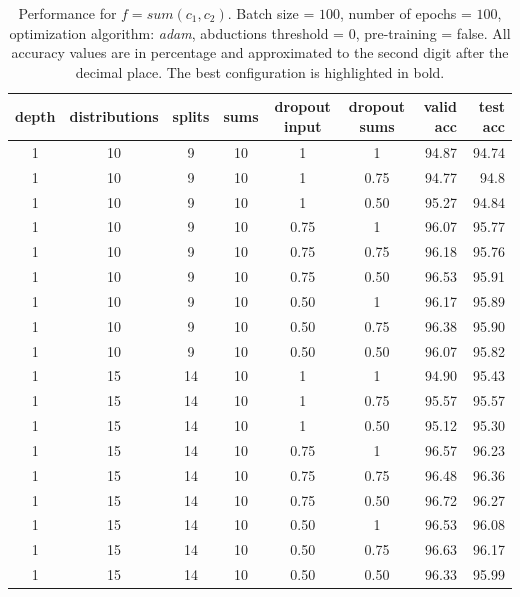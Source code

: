 \begin{table}[H]
  \centering
  \caption{Performance for $\mathit{f} = sum(\mathit{c}_1,\mathit{c}_2)$. Batch size = $100$, number of epochs = $100$, optimization algorithm: \textit{adam}, abductions threshold = 0, pre-training = false. All accuracy values are in percentage and approximated to the second digit after the decimal place. The best configuration is highlighted in bold.}
  \label{tab:results-pairs}
  \tiny
  \begin{tabular}{ccccccrr}
    \toprule
    depth		& distributions 	& splits 		& sums 				& dropout input 		& dropout sums 			& valid acc 			& test acc\\
    \midrule
    1      		& 10     			& 9      		& 10     			& 1      				& 1      				& 94.87    				& 94.74\\ 
    1      		& 10     			& 9      		& 10     			& 1      				& 0.75    				& 94.77    				& 94.8\\ 
    1      		& 10     			& 9      		& 10     			& 1      				& 0.50    				& 95.27    				& 94.84\\	
	1      		& 10     			& 9      		& 10     			& 0.75    				& 1      				& 96.07    				& 95.77\\
	1      		& 10     			& 9      		& 10     			& 0.75    				& 0.75    			    & 96.18    				& 95.76\\         
    1      		& 10     			& 9      		& 10     			& 0.75    				& 0.50    				& 96.53    				& 95.91\\ 
    1      		& 10     			& 9      		& 10     			& 0.50    				& 1      				& 96.17				    & 95.89\\
	1      		& 10     			& 9      		& 10     			& 0.50    				& 0.75    				& 96.38    				& 95.90\\   
    1      		& 10				& 9			    & 10				& 0.50					& 0.50					& 96.07    				& 95.82\\
 
	1      		& 15     			& 14     		& 10     			& 1      				& 1      				& 94.90				    & 95.43\\ 
	1      		& 15     			& 14     		& 10     			& 1      				& 0.75    				& 95.57    				& 95.57\\
	1      		& 15     			& 14     		& 10     			& 1      				& 0.50    				& 95.12    				& 95.30\\ 
	1      		& 15     			& 14     		& 10     			& 0.75    				& 1      				& 96.57				    & 96.23\\  
	1      		& 15     			& 14     		& 10     			& 0.75    				& 0.75    				& 96.48    				& 96.36\\
	1      		& 15     			& 14     		& 10     			& 0.75   	 			& 0.50    				& 96.72    				& 96.27\\ 
	1      		& 15     			& 14     		& 10     			& 0.50    				& 1      			    & 96.53    				& 96.08\\
	1      		& 15     			& 14     		& 10     			& 0.50    				& 0.75    				& 96.63    				& 96.17\\  
	1      		& 15     			& 14     		& 10     			& 0.50    				& 0.50    				& 96.33    				& 95.99\\ 


\end{tabular}
\end{table}
